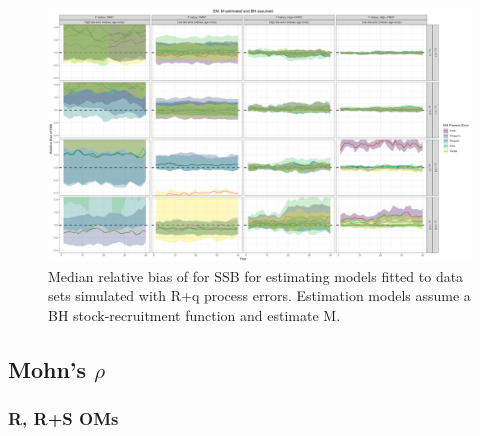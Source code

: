 \documentclass[
  12pt,
]{article}
\begin{document}
\begin{landscape}
\begin{figure}
\caption{Median relative bias of for SSB for estimating models fitted to data sets simulated with R+q process errors. Estimation models assume a BH stock-recruitment function and estimate M.}\label{q_om_em_BH_ME_relbias_ssb}
\begin{center}
\includegraphics[width = \textwidth]{q_om_BH_ME_relbias_ssb.png}
\end{center}
\end{figure}
\end{landscape}

\hypertarget{mohns-rho-1}{%
\subsection*{\texorpdfstring{Mohn's
\(\rho\)}{Mohn's \textbackslash rho}}\label{mohns-rho-1}}

\hypertarget{r-rs-oms-1}{%
\subsubsection*{R, R+S OMs}\label{r-rs-oms-1}}
\end{document}
